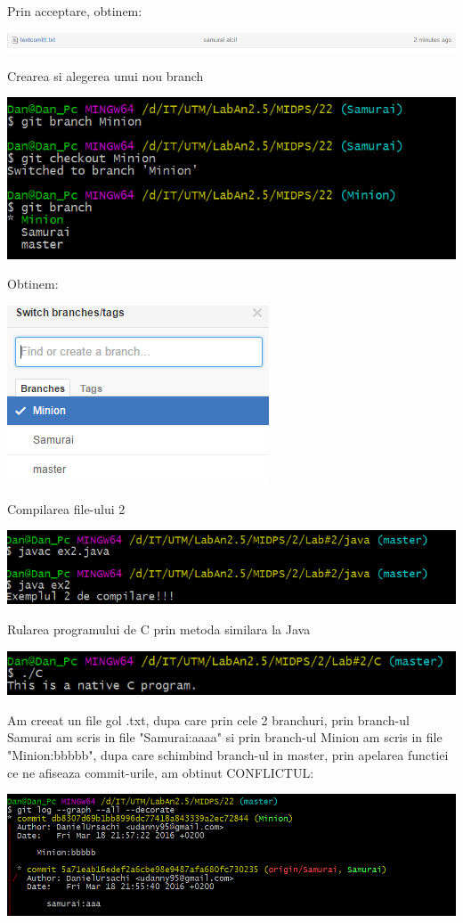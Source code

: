 Prin acceptare, obtinem:
\begin{center}
\includegraphics[width=0.7\linewidth]{9accept}
\end{center}
Crearea si alegerea unui nou branch
\begin{center}
\includegraphics[width=0.7\linewidth]{10branch2}
\end{center}
Obtinem:
\begin{center}
\includegraphics[width=0.5\linewidth]{11branch2git}
\end{center}
Compilarea file-ului 2
\begin{center}
\includegraphics[width=0.7\linewidth]{12java2}
\end{center}
Rularea programului de C prin metoda similara la Java
\begin{center}
\includegraphics[width=0.7\linewidth]{13C}
\end{center}
Am creeat un file gol .txt, dupa care prin cele 2 branchuri, prin branch-ul Samurai am scris in file "Samurai:aaaa" si prin branch-ul Minion am scris in file "Minion:bbbbb", dupa care schimbind branch-ul in master, prin apelarea functiei ce ne afiseaza commit-urile, am obtinut CONFLICTUL:
\begin{center}
\includegraphics[width=0.7\linewidth]{14conflict}
\end{center}

